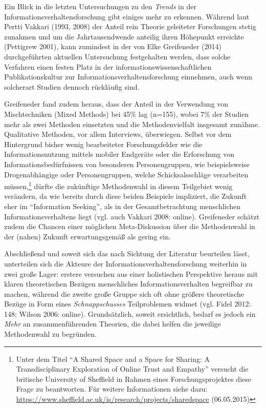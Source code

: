 \documentclass[a4paper,
fontsize=11pt,
oneside,
numbers=noperiodatend,
parskip=half-,
bibliography=totoc,
final
]{scrartcl}
\begin{document}
Ein Blick in die letzten Untersuchungen zu den \emph{Trends} in der
Informationsverhaltensforschung gibt einiges mehr zu erkennen. Während
laut Pertti Vakkari (1993, 2008) der Anteil rein Theorie geleiteter
Forschungen stetig zunahmen und um die Jahrtausendwende anteilig ihren
Höhepunkt erreichte (Pettigrew 2001), kann zumindest in der von Elke
Greifeneder (2014) durchgeführten aktuellen Untersuchung festgehalten
werden, dass solche Verfahren einen festen Platz in der
informationswissenschaftlichen Publikationskultur zur
Informationsverhaltensforschung einnehmen, auch wenn solcherart Studien
dennoch rückläufig sind.

Greifeneder fand zudem heraus, dass der Anteil in der Verwendung von
Mischtechniken (Mixed Methods) bei 45\% lag (n=155), wobei 7\% der
Studien mehr als zwei Methoden einsetzten und die Methodenvielfalt
insgesamt zunähme. Qualitative Methoden, vor allem Interviews,
überwiegen. Selbst vor dem Hintergrund bisher wenig bearbeiteter
Forschungsfelder wie die Informationsnutzung mittels mobiler Endgeräte
oder die Erforschung von Informationsbedürfnissen von besonderen
Personengruppen, wie beispielsweise Drogenabhängige oder
Personengruppen, welche Schicksalsschläge verarbeiten müssen,\footnote{Unter
  dem Titel \enquote{A Shared Space and a Space for Sharing: A
  Transdisciplinary Exploration of Online Trust and Empathy} versucht
  die britische University of Sheffield in Rahmen eines
  Forschungsprojektes diese Frage zu beantworten. Für weitere
  Informationen siehe dazu:
  \url{https://www.sheffield.ac.uk/is/research/projects/sharedspace}
  (06.05.2015)} dürfte die zukünftige Methodenwahl in diesem Teilgebiet
wenig verändern, da wie bereits durch diese beiden Beispiele impliziert,
die Zukunft eher im \enquote{Information Seeking}, als in der
Gesamtbetrachtung menschlichen Informationsverhaltens liegt (vgl. auch
Vakkari 2008: online). Greifeneder schätzt zudem die Chancen einer
möglichen Meta-Diskussion über die Methodenwahl in der (nahen) Zukunft
erwartungsgemäß als gering ein.

Abschließend und soweit sich das nach Sichtung der Literatur beurteilen
lässt, unterteilen sich die Akteure der Informationsverhaltensforschung
weiterhin in zwei große Lager: erstere versuchen aus einer holistischen
Perspektive heraus mit klaren theoretischen Bezügen menschliches
Informationsverhalten begreifbar zu machen, während die zweite große
Gruppe sich oft ohne größere theoretische Bezüge in Form eines
\emph{Schnappschusses} Teilproblemen widmet (vgl. Fidel 2012: 148;
Wilson 2006: online). Grundsätzlich, soweit ersichtlich, bedarf es
jedoch ein \emph{Mehr} an zusammenführenden Theorien, die dabei helfen
die jeweilige Methodenwahl zu begründen.
\end{document}
